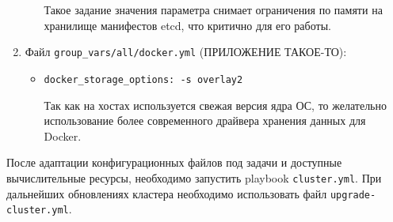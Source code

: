 \begin{enumerate}
\begin{itemize}
                Такое задание значения параметра снимает ограничения по памяти на хранилище манифестов etcd, что критично для его работы.

        \end{itemize}
    \item Файл \texttt{group\_vars/all/docker.yml} (ПРИЛОЖЕНИЕ ТАКОЕ-ТО):
        \begin{itemize}
            \item \texttt{docker\_storage\_options: -s overlay2}

                Так как на хостах используется свежая версия ядра ОС, то желательно использование более современного драйвера хранения данных для Docker.

        \end{itemize}
\end{enumerate}

После адаптации конфигурационных файлов под задачи и доступные вычислительные ресурсы, необходимо запустить playbook \texttt{cluster.yml}. При дальнейших обновлениях кластера необходимо использовать файл \texttt{upgrade-cluster.yml}.
